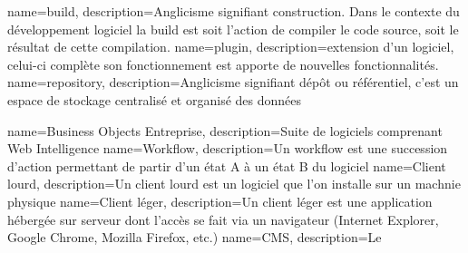 

{
	name={build},
	description={Anglicisme signifiant construction. Dans le contexte du développement logiciel la build est soit l'action de compiler le code source, soit le résultat de cette compilation.}
}
{
	name={plugin},
	description={extension d'un logiciel, celui-ci complète son fonctionnement est apporte de nouvelles fonctionnalités.}
}
{
	name={repository},
	description={Anglicisme signifiant dépôt ou référentiel, c'est un espace de stockage centralisé et organisé des données}
}

{
	name={Business Objects Entreprise},
	description={Suite de logiciels comprenant Web Intelligence}
}
{
	name={Workflow},
	description={Un workflow est une succession d'action permettant de partir d'un état A à un état B du logiciel}
}
{
	name={Client lourd},
	description={Un client lourd est un logiciel que l'on installe sur un machnie physique}
}
{
	name={Client léger},
	description={Un client léger est une application hébergée sur serveur dont l'accès se fait via un navigateur (Internet Explorer, Google Chrome, Mozilla Firefox, etc.)}
}
{
	name={CMS},
	description={Le }
}


